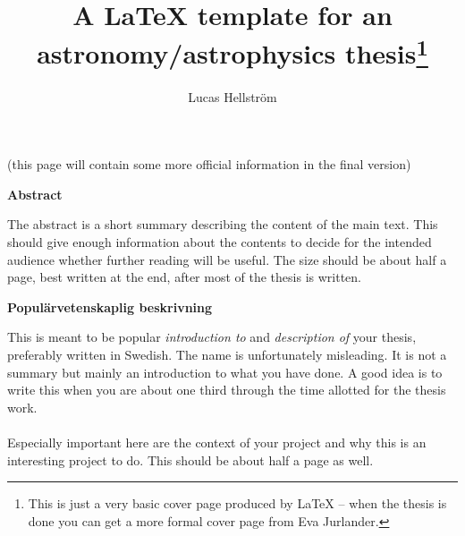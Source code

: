\documentclass[12pt]{report}
\begin{document}
\title{\huge \bf A LaTeX template for an astronomy/astrophysics
thesis\footnote{This is just a very basic cover page produced by LaTeX -- when
the thesis is done you can get a more formal cover page from Eva Jurlander.}}
\author{Lucas Hellström}

\thispagestyle{empty} %

\maketitle

\newpage

\thispagestyle{empty}

\begin{center}
  (this page will contain some more official information in the final version)
\end{center}

\newpage

\thispagestyle{empty}

\begin{center}
  {\bf Abstract}
\end{center}
The abstract is a short summary describing the content of the main text. This
should give enough information about the contents to decide for the intended
audience whether further reading will be useful. The size should be about half
a page, best written at the end, after most of the thesis is written.

\newpage

\thispagestyle{empty}
\mbox{} %

\newpage

\thispagestyle{empty}

\begin{center}
  {\bf Popul\"arvetenskaplig beskrivning}
\end{center}
This is meant to be popular {\it introduction to} and {\it description of} your
thesis, preferably written in Swedish. The name is unfortunately misleading. It
is not a summary but mainly an introduction to what you have done. A good idea
is to write this when you are about one third through the time allotted for the
thesis work.
\\ \\
Especially important here are the context of your project and why this is an
interesting project to do. This should be about half a page as well.

\newpage
\end{document}
